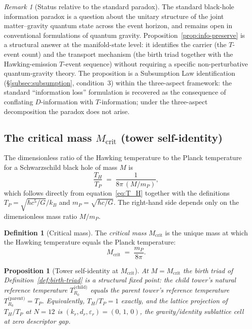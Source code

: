 \documentclass[11pt,a4paper]{article}
\newtheorem{proposition}[theorem]{Proposition}
\theoremstyle{definition}
\newtheorem{definition}[theorem]{Definition}
\theoremstyle{remark}
\newtheorem{remark}[theorem]{Remark}
\begin{document}
\begin{remark}[Status relative to the standard paradox]\label{rem:info-paradox}
The standard black-hole information paradox is a question about the unitary structure of the joint matter--gravity quantum state across the event horizon, and remains open in conventional formulations of quantum gravity. Proposition~\ref{prop:info-preserve} is a structural answer at the manifold-state level: it identifies the carrier (the $T$-event count) and the transport mechanism (the birth triad together with the Hawking-emission $T$-event sequence) without requiring a specific non-perturbative quantum-gravity theory. The proposition is a Subsumption Law identification (\S\ref{subsec:subsumption}, condition~3) within the three-aspect framework: the standard ``information loss'' formulation is recovered as the consequence of conflating $D$-information with $T$-information; under the three-aspect decomposition the paradox does not arise.
\end{remark}

\subsection{The critical mass $M_{\mathrm{crit}}$ (tower self-identity)}\label{subsec:Mcrit}

The dimensionless ratio of the Hawking temperature to the Planck temperature for a Schwarzschild black hole of mass $M$ is
\begin{equation}\label{eq:TH-over-TP}
\frac{T_{H}}{T_{P}} \;=\; \frac{1}{8\pi\,(M/m_{P})},
\end{equation}
which follows directly from equation~\eqref{eq:T_H} together with the definitions $T_{P} = \sqrt{\hbar c^{5}/G}/k_{B}$ and $m_{P} = \sqrt{\hbar c/G}$. The right-hand side depends only on the dimensionless mass ratio $M/m_{P}$.

\begin{definition}[Critical mass]\label{def:Mcrit}
The \emph{critical mass} $M_{\mathrm{crit}}$ is the unique mass at which the Hawking temperature equals the Planck temperature:
\[
M_{\mathrm{crit}} \;=\; \frac{m_{P}}{8\pi}.
\]
\end{definition}

\begin{proposition}[Tower self-identity at $M_{\mathrm{crit}}$]\label{prop:Mcrit-fixed-point}
At $M = M_{\mathrm{crit}}$ the birth triad of Definition~\ref{def:birth-triad} is a structural fixed point: the child tower's natural reference temperature $T^{\text{(child)}}_{R_{0}}$ equals the parent tower's reference temperature $T^{\text{(parent)}}_{R_{0}} = T_{P}$. Equivalently, $T_{H}/T_{P} = 1$ exactly, and the lattice projection of $T_{H}/T_{P}$ at $N=12$ is $(k_{r},d_{r},\varepsilon_{r}) = (0,\,1,\,0)$, the gravity/identity sublattice cell at zero descriptor gap.
\end{proposition}
\end{document}
